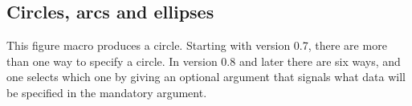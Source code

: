 \documentclass[letterpaper]{article}
\begin{document}
\subsection{Circles, arcs and ellipses}\label{circles}

\begin{cd}
%
%
\end{cd}

This figure macro produces a circle. Starting with \mfp{} version 0.7,
there are more than one way to specify a circle. In version 0.8 and
later there are six ways, and one selects which one by giving
 an optional argument that signals what data will be
specified in the mandatory argument.

\begin{cd}
\\
\\
\\
\\
\\
%
%
\end{cd}
\end{document}
